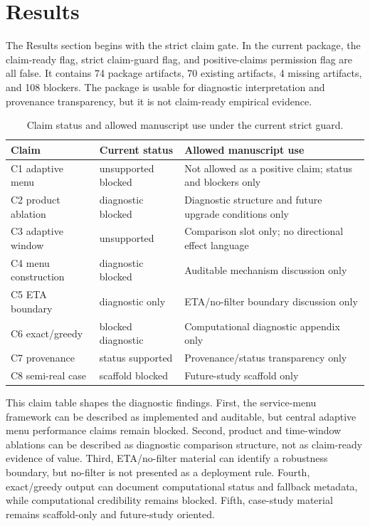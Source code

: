 \documentclass[a4paper,fleqn,review]{cas-dc}
\begin{document}
\section{Results}

The Results section begins with the strict claim gate. In the current package,
the claim-ready flag, strict claim-guard flag, and positive-claims permission
flag are all false. It contains 74 package artifacts, 70 existing artifacts, 4
missing artifacts, and 108 blockers. The package is usable for diagnostic
interpretation and provenance transparency, but it is not claim-ready
empirical evidence.

\begin{table}[t]
\centering
\caption{Claim status and allowed manuscript use under the current strict guard.}
\small
\begin{tabular}{@{}p{}p{}p{}@{}}
\toprule
Claim & Current status & Allowed manuscript use \\
\midrule
C1 adaptive menu & unsupported blocked & Not allowed as a positive claim; status and blockers only \\
C2 product ablation & diagnostic blocked & Diagnostic structure and future upgrade conditions only \\
C3 adaptive window & unsupported & Comparison slot only; no directional effect language \\
C4 menu construction & diagnostic blocked & Auditable mechanism discussion only \\
C5 ETA boundary & diagnostic only & ETA/no-filter boundary discussion only \\
C6 exact/greedy & blocked diagnostic & Computational diagnostic appendix only \\
C7 provenance & status supported & Provenance/status transparency only \\
C8 semi-real case & scaffold blocked & Future-study scaffold only \\
\bottomrule
\end{tabular}
\end{table}

This claim table shapes the diagnostic findings. First, the service-menu
framework can be described as implemented and auditable, but central adaptive
menu performance claims remain blocked. Second, product and time-window
ablations can be described as diagnostic comparison structure, not as
claim-ready evidence of value. Third, ETA/no-filter material can identify a
robustness boundary, but no-filter is not presented as a deployment rule.
Fourth, exact/greedy output can document computational status and fallback
metadata, while computational credibility remains blocked. Fifth, case-study
material remains scaffold-only and future-study oriented.
\end{document}
